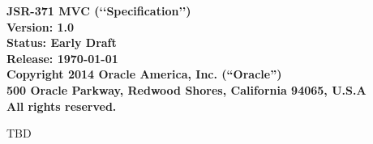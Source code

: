 \begin{flushleft}

{\bfseries JSR-371 MVC (\lq\lq Specification\rq\rq)\\
Version: 1.0 \\
Status: Early Draft \\
Release: \today\\ 
Copyright 2014 Oracle America, Inc. (``Oracle'') \\
500 Oracle Parkway, Redwood Shores, California 94065, U.S.A\\ 
All rights reserved.
}

TBD

\end{flushleft}